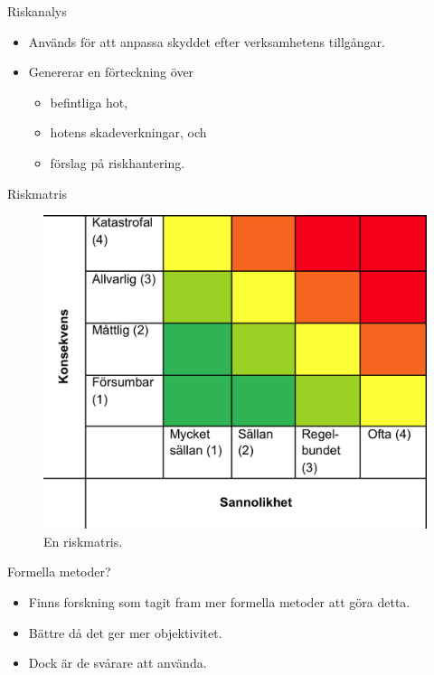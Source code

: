 \documentclass{beamer}
\begin{document}
\begin{frame}{Riskanalys}
  \begin{itemize}
    \item Används för att anpassa skyddet efter verksamhetens tillgångar.
    \item Genererar en förteckning över
      \begin{itemize}
        \item befintliga hot,
        \item hotens skadeverkningar, och
        \item förslag på riskhantering.
      \end{itemize}
  \end{itemize}
\end{frame}

\begin{frame}{Riskmatris}
  \begin{figure}
    \includegraphics[height=0.7\textheight]{riskmatris.png}
    \caption{En riskmatris.}
  \end{figure}
\end{frame}

\begin{frame}{Formella metoder?}
  \begin{itemize}
    \item Finns forskning som tagit fram mer formella metoder att göra detta.
    \item Bättre då det ger mer objektivitet.
    \item Dock är de svårare att använda.
  \end{itemize}
\end{frame}
\end{document}
